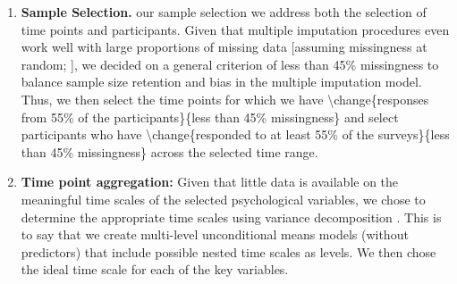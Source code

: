 \documentclass[]{article}
\providecommand{\tightlist}{%
\setlength{\itemsep}{0pt}\setlength{\parskip}{0pt}}
\newcounter{question}
\begin{document}
\begin{enumerate}
\def\labelenumi{\arabic{enumi}.}
\tightlist
\item
  \textbf{Sample Selection.}  our sample selection
  we
  address both the selection of time points and participants. Given that
  multiple imputation procedures even work well with large proportions
  of missing data {[}assuming missingness at random;
  \citet{Madley-Dowd2019}{]}, we decided on a general criterion of less
  than 45\% missingness to balance sample size retention and bias in the
  multiple imputation model. Thus, we then  select the time
  points for which we have \textbackslash change\{responses from 55\% of
  the participants\}\{less than 45\% missingness\} and 
  select participants who have \textbackslash change\{responded to at
  least 55\% of the surveys\}\{less than 45\% missingness\} across the
  selected time range.
\item
  \textbf{Time point aggregation:}
  Given that little data is available on the meaningful time scales of
  the selected psychological variables, we chose to determine the
  appropriate time scales using variance decomposition \citep[e.g.,
  see][]{Ram2014}. This is to say that we create multi-level
  unconditional means models (without predictors) that include possible
  nested time scales as levels.
  We then chose the ideal time scale for each of the key variables.
\end{enumerate}
\end{document}

